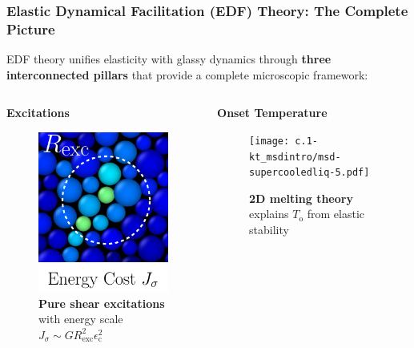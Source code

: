 \begin{frame}\label{a.3}
\frametitle{Elastic Dynamical Facilitation (EDF) Theory: The Complete Picture}

EDF theory unifies elasticity with glassy dynamics through \textbf{three interconnected pillars} that provide a complete microscopic framework:

\vspace{0.5em}

\begin{columns}[T]
\begin{column}[T]{0.33\textwidth}

\centering\textbf{\Large Excitations}

\begin{figure}[t]
\centering\includegraphics[height=0.45\textheight]{a.2-intro_dftheory/DF_Theory_Excitations_Zoom_2.pdf}
\caption{\textbf{Pure shear excitations} with energy scale $J_\sigma \sim G R_\mathrm{exc}^2 \epsilon_\mathrm{c}^2$}
\end{figure}

\end{column}

\begin{column}[T]{0.33\textwidth}

\centering\textbf{\Large Onset Temperature}

\begin{figure}[t]
\begin{center}
\centerline{\texttt{[image: c.1-kt\_msdintro/msd-supercooledliq-5.pdf]}}
\end{center}
\caption{\textbf{2D melting theory} explains $T_\mathrm{o}$ from elastic stability}
\end{figure}


\end{column}
\end{columns}
\end{frame}
